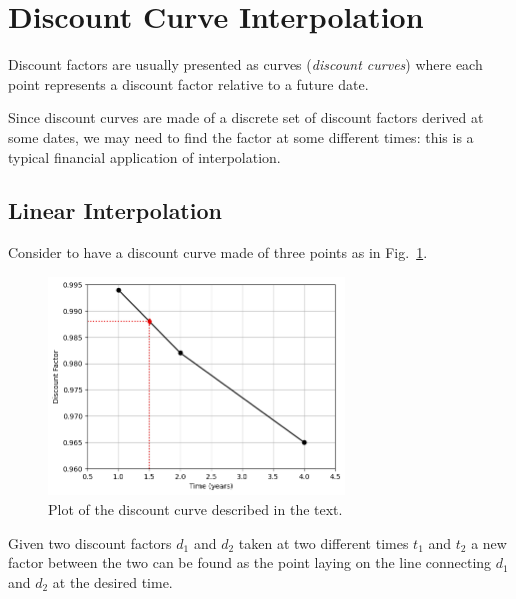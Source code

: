 \section{Discount Curve Interpolation}
\label{discount-curve-interpolation}

Discount factors are usually presented as curves (\emph{discount curves}) where each point represents a discount factor relative to a future date. 

%

Since discount curves are made of a discrete set of discount factors derived at some dates, we may need to find the factor at some different times: this is a typical financial application of interpolation.

\subsection{Linear Interpolation}
\label{linear-interpolation}

Consider to have a discount curve made of three points as in Fig.~\ref{fig:samples_for_interpolation}.

\begin{figure}[htbp]
  \centering
  \includegraphics[width=0.7\textwidth]{figures/interp_example1}
  \caption{Plot of the discount curve described in the text.}
  \label{fig:samples_for_interpolation}
\end{figure}

Given two discount factors $d_1$ and $d_2$ taken at two different times $t_1$ and $t_2$ a new factor between the two can be found as the point laying on the line connecting $d_1$ and $d_2$ at the desired time. 

